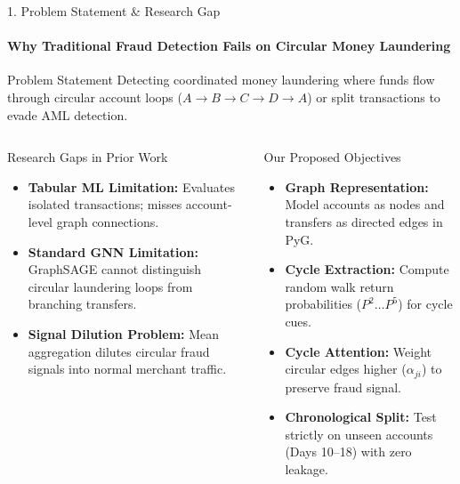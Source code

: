 \documentclass[aspectratio=169, 11pt]{beamer}
\begin{document}
\begin{frame}{1. Problem Statement \& Research Gap}
    \framesubtitle{Why Traditional Fraud Detection Fails on Circular Money Laundering}
    \vspace{-0.35cm}
    \begin{alertblock}{Problem Statement}
        \scriptsize
        Detecting coordinated money laundering where funds flow through circular account loops ($A \to B \to C \to D \to A$) or split transactions to evade AML detection.
    \end{alertblock}
    \vspace{-0.2cm}
    \begin{columns}[T]
        \begin{block}{Research Gaps in Prior Work}
            \scriptsize
            \begin{itemize}\setlength{\itemsep}{1pt}\setlength{\parskip}{0pt}
                \item \textbf{Tabular ML Limitation:} Evaluates isolated transactions; misses account-level graph connections.
                \item \textbf{Standard GNN Limitation:} GraphSAGE cannot distinguish circular laundering loops from branching transfers.
                \item \textbf{Signal Dilution Problem:} Mean aggregation dilutes circular fraud signals into normal merchant traffic.
            \end{itemize}
        \end{block}

        \begin{block}{Our Proposed Objectives}
            \scriptsize
            \begin{itemize}\setlength{\itemsep}{1pt}\setlength{\parskip}{0pt}
                \item \textbf{Graph Representation:} Model accounts as nodes and transfers as directed edges in PyG.
                \item \textbf{Cycle Extraction:} Compute random walk return probabilities ($P^2 \dots P^5$) for cycle cues.
                \item \textbf{Cycle Attention:} Weight circular edges higher ($\alpha_{ji}$) to preserve fraud signal.
                \item \textbf{Chronological Split:} Test strictly on unseen accounts (Days 10--18) with zero leakage.
            \end{itemize}
        \end{block}
    \end{columns}
\end{frame}
\end{document}
